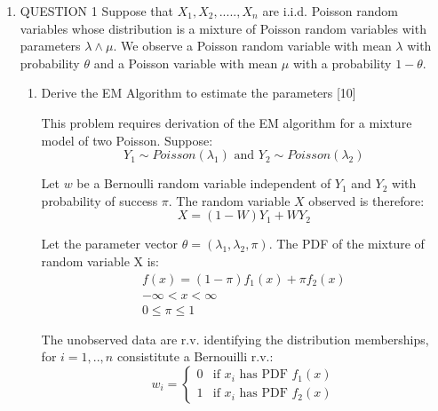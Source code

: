 \documentclass{article}
\begin{document}
    \begin{enumerate}
        \item QUESTION 1
        Suppose that $X_{1}, X_{2},.....,X_{n}$ are i.i.d. Poisson random variables whose distribution is a mixture of Poisson random variables with parameters $\lambda\wedge\mu$. We observe a Poisson random variable with mean $\lambda$ with probability $\theta$ and a Poisson variable with mean $\mu$ with a probability $1-\theta$.
            \begin{enumerate}
                \item Derive the EM Algorithm to estimate the parameters \hfill[10]
                
                This problem requires derivation of the EM algorithm for a mixture model of two Poisson. Suppose:
                \begin{equation*}
                    Y_{1}\sim Poisson(\lambda_{1})\text{ and }Y_{2}\sim Poisson(\lambda_{2})
                \end{equation*}
                
                Let $w$ be a Bernoulli random variable independent of $Y_{1}$ and $Y_2$ with probability of success $\pi$. The random variable $X$ observed is therefore:
                \begin{equation*}
                    X = (1-W)Y_{1} + WY_{2}
                \end{equation*}
                
                Let the parameter vector $\theta = (\lambda_1, \lambda_2, \pi)$. The PDF of the mixture of random variable X is:
                \begin{equation*}
                 \begin{gathered}
                   f(x) = (1-\pi)f_1(x) + \pi f_2(x)\\ -\infty<x<\infty\\
                   0\leq\pi\leq1  
                \end{gathered}
                \end{equation*}
                
                The unobserved data are r.v. identifying the distribution memberships, for $i=1,..,n$ consistitute a Bernouilli r.v.:
                \begin{equation}
                  w_{i} =
                    \begin{cases}
                      0 & \text{if $x_i$ has PDF $f_{1}(x)$}\\
                      1 & \text{if $x_i$ has PDF $f_{2}(x)$}
                    \end{cases}       
                \end{equation}
                

\end{enumerate}
\end{enumerate}
\end{document}
